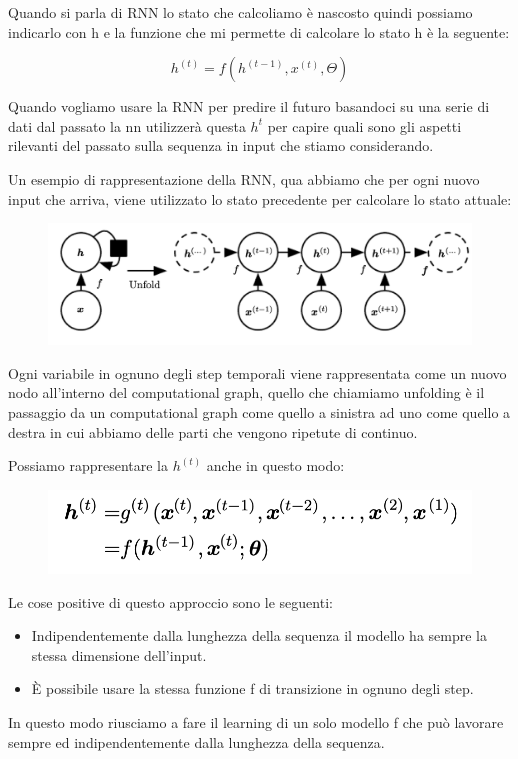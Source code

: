 \documentclass[14pt]{extreport}
\begin{document}
Quando si parla di RNN lo stato che calcoliamo è nascosto quindi possiamo indicarlo con h e la funzione che mi permette di calcolare lo stato h è la
seguente:

$$h^{(t)} = f(h^{(t-1)}, x^{(t)}, \Theta)$$

Quando vogliamo usare la RNN per predire il futuro basandoci su una serie di dati dal passato la nn utilizzerà questa $h^{t}$ per capire quali sono
gli aspetti rilevanti del passato sulla sequenza in input che stiamo considerando.

Un esempio di rappresentazione della RNN, qua abbiamo che per ogni nuovo input che arriva, viene utilizzato lo stato precedente per calcolare lo stato
attuale:
\begin{figure}[H]
	\centering
	\includegraphics[width=0.7\linewidth]{415.jpeg}
\end{figure}

Ogni variabile in ognuno degli step temporali viene rappresentata come un nuovo nodo all'interno del computational graph, quello che chiamiamo
unfolding è il passaggio da un computational graph come quello a sinistra ad uno come quello a destra in cui abbiamo delle parti che vengono ripetute
di continuo.

Possiamo rappresentare la $h^{(t)}$ anche in questo modo:
\begin{figure}[H]
	\centering
	\includegraphics[width=0.7\linewidth]{416.jpeg}
\end{figure}

Le cose positive di questo approccio sono le seguenti:
\begin{itemize}
	\item Indipendentemente dalla lunghezza della sequenza il modello ha sempre la stessa dimensione dell'input.
	\item È possibile usare la stessa funzione f di transizione in ognuno degli step.
\end{itemize}

In questo modo riusciamo a fare il learning di un solo modello f che può lavorare sempre ed indipendentemente dalla lunghezza della sequenza.
\end{document}
